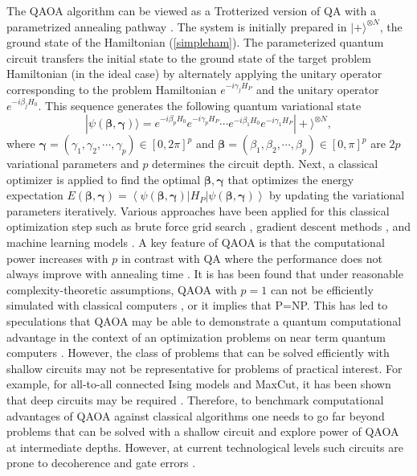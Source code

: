\documentclass[fleqn,10pt]{wlscirep}
\def\change#1{#1}
\begin{document}
The QAOA algorithm can be viewed as a Trotterized version of QA with a parametrized annealing pathway \cite{zhou2020quantum}. 
The system is initially prepared in $|+\rangle^{\otimes N}$, the ground state of the  Hamiltonian (\ref{simpleham}).  The parameterized quantum circuit transfers the initial state to the ground state of the target problem Hamiltonian \change{(in the ideal case)} by alternately applying the unitary operator corresponding to the problem Hamiltonian $e^{-i \gamma_{j} H_P}$ and the unitary operator $e^{-i \beta_{j} H_{0}}$.  This sequence generates the following quantum variational state 
%
 \begin{equation}
     |\psi(\boldsymbol{\beta}, \boldsymbol{\gamma})\rangle=e^{-i \beta_{p} H_{0}} e^{-i \gamma_{p} H_P} \cdots e^{-i \beta_{1} H_{0}} e^{-i \gamma_{1} H_P}|+\rangle^{\otimes N} ,
 \end{equation}
where $ \boldsymbol{\gamma}=\left(\gamma_{1}, \gamma_{2}, \cdots, \gamma_{p}\right) \in[0, 2\pi]^p$ and $\boldsymbol{\beta}=\left(\beta_{1}, \beta_{2}, \cdots, \beta_{p}\right) \in[0, \pi]^p$ are $2p$ variational parameters and $p$ determines the circuit depth. Next, a classical optimizer is applied to find the optimal $ \boldsymbol{\beta}, \boldsymbol{\gamma} $ that optimizes the energy expectation $
    E(\boldsymbol{\beta}, \boldsymbol{\gamma})=\left\langle\psi(\boldsymbol{\beta}, \boldsymbol{\gamma})\left|H_P\right| \psi(\boldsymbol{\beta}, \boldsymbol{\gamma})\right\rangle $
by updating the variational parameters iteratively.  Various approaches have been applied for this classical optimization step such as brute force grid search \cite{farhi2014quantum}, gradient descent methods \cite{guerreschi2017practical}, and machine learning models \cite{khairy2020learning}. 
A key feature of QAOA is that the computational power increases with $p$ \cite{zhou2020quantum,pagano2020quantum} in contrast with QA where the performance does not always improve with annealing time \cite{farhi2014quantum}.   It is has been found that under reasonable complexity-theoretic assumptions, QAOA with $p=1$  can not be efficiently simulated with classical computers  \cite{farhi2016quantum}, or it implies that P=NP. This has led to speculations that QAOA may be able to demonstrate \change{a quantum computational advantage} in the context of an optimization problems on near term quantum computers \cite{farhi2016quantum}. However, the class of problems that can be solved efficiently with shallow circuits may not be representative for problems of practical interest. For example, for all-to-all connected Ising models and MaxCut, it has been shown that deep circuits may be required \cite{harrigan2021quantum}.  Therefore, to benchmark computational  advantages of QAOA  against classical algorithms one needs to go far beyond problems that can be solved with a shallow circuit and explore power of QAOA at  intermediate depths. However, at current technological levels such circuits are prone to decoherence and gate errors \cite{harrigan2021quantum}.
\end{document}

